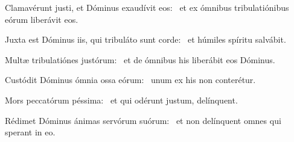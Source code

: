 \item Clamavérunt justi, et Dóminus exaudívit eos:~\psstar{} et ex ómnibus tribulatiónibus eórum liberávit eos.

\item Juxta est Dóminus iis, qui tribuláto sunt corde:~\psstar{} et húmiles spíritu salvábit.

\item Multæ tribulatiónes justórum:~\psstar{} et de ómnibus his liberábit eos Dóminus.

\item Custódit Dóminus ómnia ossa eórum:~\psstar{} unum ex his non conterétur.

\item Mors peccatórum péssima:~\psstar{} et qui odérunt justum, delínquent.

\item Rédimet Dóminus ánimas servórum suórum:~\psstar{} et non delínquent omnes qui sperant in eo.

